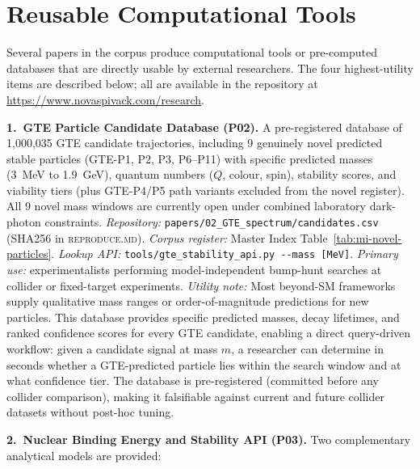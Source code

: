 \documentclass[11pt]{article}
\begin{document}
\section{Reusable Computational Tools}
\label{app:tools}

Several papers in the corpus produce computational tools or pre-computed databases
that are directly usable by external researchers.
The four highest-utility items are described below; all are available in the
repository at \url{https://www.novaspivack.com/research}.

\medskip
\noindent\textbf{1.\ GTE Particle Candidate Database (P02).}
A pre-registered database of 1,000,035 GTE candidate trajectories, including
9 genuinely novel predicted stable particles (GTE-P1, P2, P3, P6--P11) with specific
predicted masses (3~MeV to 1.9~GeV), quantum numbers ($Q$, colour, spin),
stability scores, and viability tiers (plus GTE-P4/P5 path variants excluded from
the novel register).  All 9 novel mass windows are currently open
under combined laboratory dark-photon constraints.
\emph{Repository:} \texttt{papers/02\_GTE\_spectrum/candidates.csv} (SHA256 in \textsc{reproduce.md}).
\emph{Corpus register:} Master Index Table~\ref{tab:mi-novel-particles}.
\emph{Lookup API:} \texttt{tools/gte\_stability\_api.py -{}-mass [MeV]}.
\emph{Primary use:} experimentalists performing model-independent bump-hunt searches
at collider or fixed-target experiments.
\emph{Utility note:} Most beyond-SM frameworks supply qualitative mass ranges or
order-of-magnitude predictions for new particles.
This database provides specific predicted masses, decay lifetimes, and ranked confidence
scores for every GTE candidate, enabling a direct query-driven workflow: given a candidate
signal at mass $m$, a researcher can determine in seconds whether a GTE-predicted particle
lies within the search window and at what confidence tier.
The database is pre-registered (committed before any collider comparison), making it
falsifiable against current and future collider datasets without post-hoc tuning.

\medskip
\noindent\textbf{2.\ Nuclear Binding Energy and Stability API (P03).}
Two complementary analytical models are provided:
\end{document}
